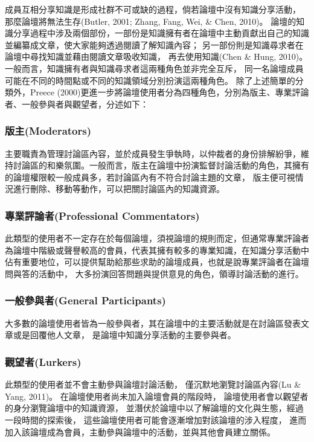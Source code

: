 成員互相分享知識是形成社群不可或缺的過程，倘若論壇中沒有知識分享活動，
那麼論壇將無法生存(Butler, 2001; Zhang, Fang, Wei, \& Chen, 2010)。
論壇的知識分享過程中涉及兩個部份，一部份是知識擁有者在論壇中主動貢獻出自己的知識並編纂成文章，使大家能夠透過閱讀了解知識內容；
另一部份則是知識尋求者在論壇中尋找知識並藉由閱讀文章吸收知識，
再去使用知識(Chen \& Hung, 2010)。
一般而言，知識擁有者與知識尋求者這兩種角色並非完全互斥，
同一名論壇成員可能在不同的時間點或不同的知識領域分別扮演這兩種角色。
 除了上述簡單的分類外，Preece (2000)更進一步將論壇使用者分為四種角色，分別為版主、專業評論者、一般參與者與觀望者，分述如下：

\subsubsection{版主(Moderators)} 
主要職責為管理討論區內容，並於成員發生爭執時，以仲裁者的身份排解紛爭，維持討論區的和樂氛圍。一般而言，版主在論壇中扮演監督討論活動的角色，其擁有的論壇權限較一般成員多，若討論區內有不符合討論主題的文章，
版主便可視情況進行刪除、移動等動作，可以把關討論區內的知識資源。

\subsubsection{專業評論者(Professional Commentators)} 
此類型的使用者不一定存在於每個論壇，須視論壇的規則而定，但通常專業評論者為論壇中階級或聲譽較高的會員，代表其擁有較多的專業知識，在知識分享活動中佔有重要地位，可以提供幫助給那些求助的論壇成員，也就是說專業評論者在論壇問與答的活動中，
大多扮演回答問題與提供意見的角色，領導討論活動的進行。

\subsubsection{一般參與者(General Participants)} 
大多數的論壇使用者皆為一般參與者，其在論壇中的主要活動就是在討論區發表文章或是回覆他人文章，
是論壇中知識分享活動的主要參與者。

\subsubsection{觀望者(Lurkers)} 
此類型的使用者並不會主動參與論壇討論活動，
僅沉默地瀏覽討論區內容(Lu \& Yang, 2011)。
在論壇使用者尚未加入論壇會員的階段時，
論壇使用者會以觀望者的身分瀏覽論壇中的知識資源，
並潛伏於論壇中以了解論壇的文化與生態，經過一段時間的探索後，
這些論壇使用者可能會逐漸增加對該論壇的涉入程度，
進而加入該論壇成為會員，主動參與論壇中的活動，並與其他會員建立關係。


